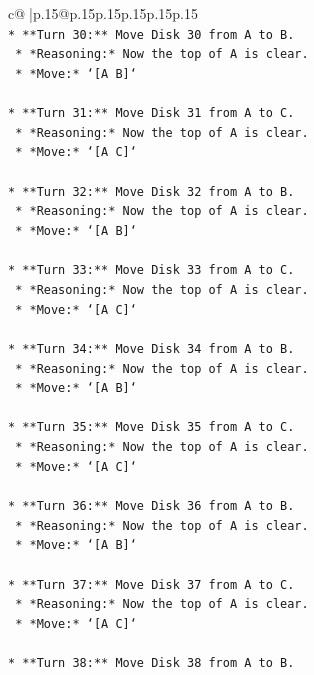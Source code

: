 \documentclass{article}
\begin{document}
{\begin{supertabular}{c@{$\;$}|p{.15\linewidth}@{}p{.15\linewidth}p{.15\linewidth}p{.15\linewidth}p{.15\linewidth}p{.15\linewidth}}
{{{\\ 
\texttt{*   **Turn 30:** Move Disk 30 from A to B.} \\
\texttt{    *   *Reasoning:* Now the top of A is clear.} \\
\texttt{    *   *Move:* `{[}A B{]}`} \\
\\ 
\texttt{*   **Turn 31:** Move Disk 31 from A to C.} \\
\texttt{    *   *Reasoning:* Now the top of A is clear.} \\
\texttt{    *   *Move:* `{[}A C{]}`} \\
\\ 
\texttt{*   **Turn 32:** Move Disk 32 from A to B.} \\
\texttt{    *   *Reasoning:* Now the top of A is clear.} \\
\texttt{    *   *Move:* `{[}A B{]}`} \\
\\ 
\texttt{*   **Turn 33:** Move Disk 33 from A to C.} \\
\texttt{    *   *Reasoning:* Now the top of A is clear.} \\
\texttt{    *   *Move:* `{[}A C{]}`} \\
\\ 
\texttt{*   **Turn 34:** Move Disk 34 from A to B.} \\
\texttt{    *   *Reasoning:* Now the top of A is clear.} \\
\texttt{    *   *Move:* `{[}A B{]}`} \\
\\ 
\texttt{*   **Turn 35:** Move Disk 35 from A to C.} \\
\texttt{    *   *Reasoning:* Now the top of A is clear.} \\
\texttt{    *   *Move:* `{[}A C{]}`} \\
\\ 
\texttt{*   **Turn 36:** Move Disk 36 from A to B.} \\
\texttt{    *   *Reasoning:* Now the top of A is clear.} \\
\texttt{    *   *Move:* `{[}A B{]}`} \\
\\ 
\texttt{*   **Turn 37:** Move Disk 37 from A to C.} \\
\texttt{    *   *Reasoning:* Now the top of A is clear.} \\
\texttt{    *   *Move:* `{[}A C{]}`} \\
\\ 
\texttt{*   **Turn 38:** Move Disk 38 from A to B.} \\
}}}
\end{supertabular}}
\end{document}
